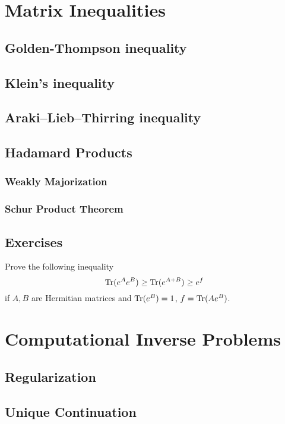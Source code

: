 \chapter{Matrix Inequalities}
\section{Golden-Thompson inequality}
\section{Klein's inequality}
\section{Araki–Lieb–Thirring inequality}
\section{Hadamard Products}
\subsection{Weakly Majorization}
\subsection{Schur Product Theorem}
\section{Exercises}
\begin{problem}
Prove the following inequality 
    \begin{equation*}
        {\textrm{Tr}}(e^A e^B) \ge {\textrm{Tr}}(e^{A + B}) \ge e^f
    \end{equation*}
    if $A, B$ are Hermitian matrices and ${\textrm{Tr}}(e^B) = 1$, $f = {\textrm{Tr}}(A e^B)$.
\end{problem}
\newpage
\chapter{Computational Inverse Problems}
\section{Regularization}
\section{Unique Continuation}